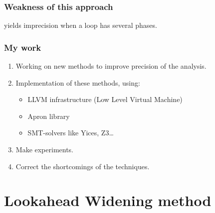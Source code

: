 \documentclass{beamer}
\begin{document}
\begin{frame}
\begin{columns}
\begin{column}{5cm}
\end{column}
\end{columns}
\end{frame}

\begin{frame}
  \frametitle{Weakness of this approach}
	\begin{center}
		yields imprecision when a loop has several phases.
	\end{center}
\end{frame}

\begin{frame}
  \frametitle{My work}
\begin{enumerate}
\item Working on new methods to improve precision of the analysis.
\item Implementation of these methods, using:
\begin{itemize}
\item LLVM infrastructure (Low Level Virtual Machine)
\item Apron library
\item SMT-solvers like Yices, Z3\ldots
\end{itemize}
\item Make experiments.
\item Correct the shortcomings of the techniques.
\end{enumerate}
\end{frame}

\section[Lookahead Widening]{Lookahead Widening method}
\end{document}
